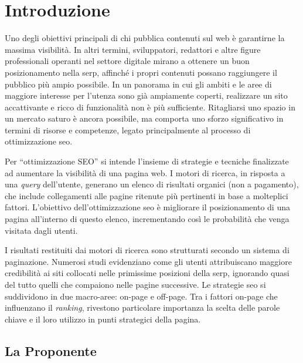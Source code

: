\chapter{Introduzione}
\label{cap:introduzione}

\par Uno degli obiettivi principali di chi pubblica contenuti sul web è garantirne la massima visibilità. In altri termini, sviluppatori, redattori e altre figure professionali operanti nel settore digitale mirano a ottenere un buon posizionamento nella \gls{serp}, affinché i propri contenuti possano raggiungere il pubblico più ampio possibile. In un panorama in cui gli ambiti e le aree di maggiore interesse per l’utenza sono già ampiamente coperti, realizzare un sito accattivante e ricco di funzionalità non è più sufficiente. Ritagliarsi uno spazio in un mercato saturo è ancora possibile, ma comporta uno sforzo significativo in termini di risorse e competenze, legato principalmente al processo di ottimizzazione \gls{seo}.

\vspace{10pt}
\par\noindent Per “ottimizzazione SEO” si intende l’insieme di strategie e tecniche finalizzate ad aumentare la visibilità di una pagina web. I motori di ricerca, in risposta a una \textit{query} dell’utente, generano un elenco di risultati organici (non a pagamento), che include collegamenti alle pagine ritenute più pertinenti in base a molteplici fattori. L’obiettivo dell’ottimizzazione \gls{seo} è migliorare il posizionamento di una pagina all’interno di questo elenco, incrementando così le probabilità che venga visitata dagli utenti.

\vspace{10pt}
\par\noindent I risultati restituiti dai motori di ricerca sono strutturati secondo un sistema di paginazione. Numerosi studi evidenziano come gli utenti attribuiscano maggiore credibilità ai siti collocati nelle primissime posizioni della \gls{serp}, ignorando quasi del tutto quelli che compaiono nelle pagine successive. Le strategie \gls{seo} si suddividono in due macro-aree: \gls{on-page} e \gls{off-page}. Tra i fattori \gls{on-page} che influenzano il \textit{ranking}, rivestono particolare importanza la scelta delle parole chiave e il loro utilizzo in punti strategici della pagina.

\section{La Proponente}

